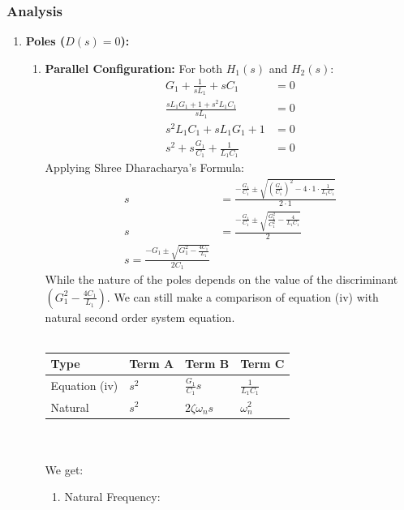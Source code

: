 \subsubsection{Analysis}
\begin{enumerate}
  \item \textbf{Poles (\(D(s) = 0\)):} \\
    \begin{enumerate}
      \item \textbf{Parallel Configuration:}
        For both \(H_1(s)\) and \(H_2(s)\):
        \begin{align*}
          G_1 + \frac{1}{sL_1} + sC_1 &= 0 \\
          \frac{s L_1 G_1 + 1 + s^2 L_1 C_1}{s L_1} &= 0 \\
          s^2 L_1 C_1 + s L_1 G_1 + 1 &= 0 \\
          s^2 + s \frac{G_1}{C_1} + \frac{1}{L_1 C_1} &= 0 \tag{4}
        \end{align*}
        Applying Shree Dharacharya's Formula:
        \begin{align*}
          s &= \frac{-\frac{G_1}{C_1} \pm \sqrt{\left(\frac{G_1}{C_1}\right)^2 - 4 \cdot 1 \cdot \frac{1}{L_1 C_1}}}{2 \cdot 1} \\
          s &= \frac{-\frac{G_1}{C_1} \pm \sqrt{\frac{G_1^2}{C_1^2} - \frac{4}{L_1 C_1}}}{2} \\
          \boxed{s = \frac{-G_1 \pm \sqrt{G_1^2 - \frac{4 C_1}{L_1}}}{2 C_1}}
        \end{align*}
        While the nature of the poles depends on the value of the
        discriminant \(\left(G_1^2 - \frac{4 C_1}{L_1}\right)\).
        We can still make a comparison of equation (iv) with natural
        second order system equation.\\ \\
        \begin{tabularx}{\linewidth}{|X|X|X|X|} \hline
          Type & Term A & Term B & Term C \\ \hline
          Equation (iv) & \(s^2\) & \(\frac{G_1}{C_1} s\) & \(\frac{1}{L_1 C_1}\) \\ \hline
          Natural & \(s^2\) & \(2 \zeta \omega_n s\) & \(\omega_n^2\) \\ \hline
        \end{tabularx}\\ \\
        We get:
        \begin{enumerate}
          \item Natural Frequency:

\end{enumerate}
\end{enumerate}
\end{enumerate}
